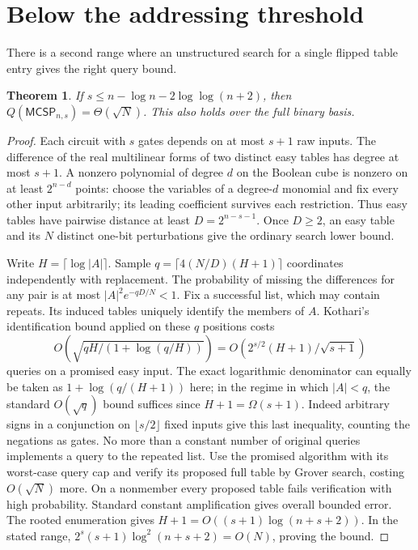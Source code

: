 \documentclass[11pt]{article}
\newtheorem{theorem}{Theorem}\newtheorem{lemma}[theorem]{Lemma}\newtheorem{corollary}[theorem]{Corollary}
\newcommand{\mc}{\mathsf{MCSP}}\newcommand{\F}{\mathbb F_2}\newcommand{\E}{\mathbb E}
\begin{document}
\section{Below the addressing threshold}
There is a second range where an unstructured search for a single flipped table entry gives the right query bound.
\begin{theorem}\label{low}
If $s\le n-\log n-2\log\log(n+2)$, then $Q(\mc_{n,s})=\Theta(\sqrt N)$. This also holds over the full binary basis.
\end{theorem}
\begin{proof}
Each circuit with $s$ gates depends on at most $s+1$ raw inputs. The difference of the real multilinear forms of two distinct easy tables has degree at most $s+1$. A nonzero polynomial of degree $d$ on the Boolean cube is nonzero on at least $2^{n-d}$ points: choose the variables of a degree-$d$ monomial and fix every other input arbitrarily; its leading coefficient survives each restriction. Thus easy tables have pairwise distance at least $D=2^{n-s-1}$. Once $D\ge2$, an easy table and its $N$ distinct one-bit perturbations give the ordinary search lower bound.

Write $H=\lceil\log |A|\rceil$. Sample $q=\lceil 4(N/D)(H+1)\rceil$ coordinates independently with replacement. The probability of missing the differences for any pair is at most $|A|^2 e^{-qD/N}<1$. Fix a successful list, which may contain repeats. Its induced tables uniquely identify the members of $A$. Kothari's identification bound applied on these $q$ positions costs
\[
 O\!\left(\sqrt{qH/(1+\log(q/H))}\right)
 =O\!\left(2^{s/2}(H+1)/\sqrt{s+1}\right)
\]
queries on a promised easy input. The exact logarithmic denominator can equally be taken as $1+\log(q/(H+1))$ here; in the regime in which $|A|<q$, the standard $O(\sqrt q)$ bound suffices since $H+1=\Omega(s+1)$. Indeed arbitrary signs in a conjunction on $\lfloor s/2\rfloor$ fixed inputs give this last inequality, counting the negations as gates. No more than a constant number of original queries implements a query to the repeated list. Use the promised algorithm with its worst-case query cap and verify its proposed full table by Grover search, costing $O(\sqrt N)$ more. On a nonmember every proposed table fails verification with high probability. Standard constant amplification gives overall bounded error. The rooted enumeration gives $H+1=O((s+1)\log(n+s+2))$. In the stated range, $2^s(s+1)\log^2(n+s+2)=O(N)$, proving the bound.
\end{proof}
\end{document}
